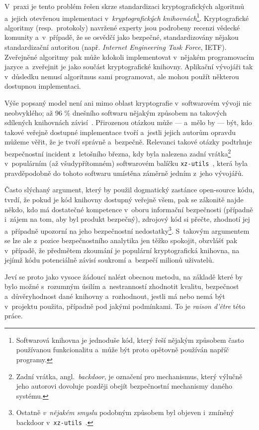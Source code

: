 V~praxi je tento problém řešen skrze standardizaci kryptografických algoritmů a~jejich otev\-ře\-nou im\-ple\-men\-ta\-ci v~\emph{kryptografických knihovnách}\footnote{Softwarová knihovna je jednoduše kód, který řeší nějakým způsobem často používanou funkcionalitu a~může být proto opětovně používán napříč programy.}.
Kryptografické algoritmy (resp.\ protokoly) na\-vr\-že\-né experty jsou podrobeny recenzi vědecké komunity a~v~případě, že se osvědčí jako bezpečné, standardizovány nějakou standardizační autoritou (např. \textit{Internet Engineering Task Force}, IETF). Zveřejněné algoritmy pak může kdokoli implementovat v~nějakém programovacím jazyce a~z\-ve\-řej\-nit je jako součást kryptografické knihovny. Aplikační vývojáři tak v~důsledku nemusí algoritmus sami programovat, ale mohou použít některou dostupnou implementaci.

Výše popsaný model není ani mimo oblast kryptografie v~softwarovém vývoji nic neobvyklého; až 96 \% dnešního softwaru nějakým způsobem na takových sdílených knihovnách závisí~\cite{synopsysossreport}. Přirozenou otázkou může --- a~mělo by --- být, kdo takové veřejně dostupné implementace tvoří a~jestli jejich autorům opravdu můžeme věřit, že je tvoří správně a~bezpečně. Relevanci takové otázky podtrhuje bezpečnostní incident z~letošního března, kdy byla nalezena zadní vrátka\footnote{Zadní vrátka, angl.\ \textit{backdoor}, je označení pro mechanismus, který výlučně jeho autorovi dovoluje později obejít bezpečnostní mechanismy daného systému.} v~populárním (až všudypřítomném) softwarovém balíčku \texttt{xz-utils}~\cite{cve-2024-3094}, která byla pravděpodobně do tohoto softwaru umístěna záměrně jedním z~jeho vývojářů.

Často slýchaný argument, který by použil dogmatický zastánce open-source kódu, tvrdí, že pokud je kód knihovny dostupný veřejně všem, pak se zákonitě najde někdo, kdo má dostatečné kompetence v~oboru informační bezpečnosti (případně i~zájem na tom, aby byl produkt bezpečný), zdrojový kód si přečte, zhodnotí jej a~případně upozorní na jeho bezpečnostní nedostatky\footnote{Ostatně \emph{v~nějakém smyslu} podobným způsobem byl objeven i~zmíněný backdoor v~\texttt{xz-utils}~\cite{vergexz}.}. S~takovým argumentem se lze ale z~pozice bezpečnostního analytika jen těžko spokojit, obzvlášť pak v~případě, že předmětem zkoumání je populární kryptografická knihovna, na jejímž kódu potenciálně závisí soukromí a~bezpečí milionů uživatelů.

Jeví se proto jako vysoce žádoucí nalézt obecnou metodu, na základě které by bylo možné s~rozumným úsilím a~nestranností zhodnotit kvalitu, bezpečnost a~důvěryhodnost dané knihovny a~rozhodnout, jestli má nebo nemá být v~projektu použita, případně pod jakými podmínkami. To je \textit{raison d'être} této práce.

